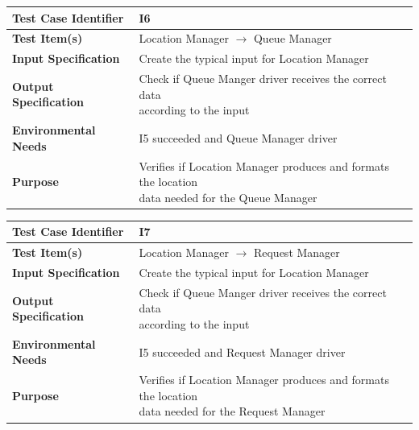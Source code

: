 \documentclass[11pt,titlepage]{article} %
\begin{document}
  \vspace{15cm}
  
  \begin{table}[ht!]
    \begin{tabular*}{16cm}{ll}
	\hline
	\textbf{Test Case Identifier} & I6\\
	\hline
	\textbf{Test Item(s)} & Location Manager $ \longrightarrow $ Queue Manager \\
	\hline
	\textbf{Input Specification} & Create the typical input for Location Manager\\
	\hline
	\textbf{Output Specification} & \pbox{20cm}{Check if Queue Manger driver receives the correct data \\ according to the input} \\
	\hline
	\textbf{Environmental Needs} & I5 succeeded and Queue Manager driver \\
	\hline
	\textbf{Purpose} & \pbox{20cm}{Verifies if Location Manager produces and formats the location \\ data needed for the Queue Manager} \\
	\hline
    \end{tabular*}
  \end{table}
  
  \begin{table}[ht!]
    \begin{tabular*}{16cm}{ll}
	\hline
	\textbf{Test Case Identifier} & I7 \\
	\hline
	\textbf{Test Item(s)} & Location Manager $ \longrightarrow $ Request Manager \\
	\hline
	\textbf{Input Specification} & Create the typical input for Location Manager \\
	\hline
	\textbf{Output Specification} & \pbox{20cm}{Check if Queue Manger driver receives the correct data \\ according to the input} \\
	\hline
	\textbf{Environmental Needs} & I5 succeeded and Request Manager driver \\
	\hline
	\textbf{Purpose} & \pbox{20cm}{Verifies if Location Manager produces and formats the location \\ data needed for the Request Manager} \\
	\hline
    \end{tabular*}
  \end{table}
  
\end{document}

